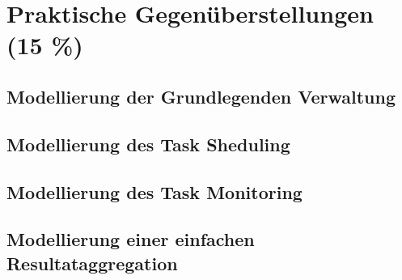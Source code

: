 \chapter{Praktische Gegenüberstellungen (15 \%)}
\section{Modellierung der Grundlegenden Verwaltung}
\section{Modellierung des Task Sheduling}
\section{Modellierung des Task Monitoring}
\section{Modellierung einer einfachen Resultataggregation}
